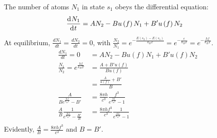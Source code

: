 \documentclass{article}
\begin{document}
\clearpage

The number of atoms $N_1$ in state $s_1$ obeys the differential equation:
\begin{equation}
    \begin{split}
        \deriv{N_1}{t} & = AN_2 - Bu\left(f\right)N_1 + B'u\left(f\right)N_2
    \end{split}
\end{equation}
At equilibrium, $\frac{dN_1}{dt} = \frac{dN_2}{dt} = 0$, with $\frac{N_2}{N_1} = e^{-\frac{E(s_2) - E(s_1)}{k_BT}} = e^{-\frac{\epsilon}{k_BT}} = e^{-\frac{hf}{k_BT}}$. 
    \begin{equation}
        \begin{split}
            \frac{dN_1}{dt} = 0 & = AN_2 - Bu\left(f\right)N_1 + B'u\left(f\right)N_2 \\
            \frac{N_1}{N_2} = e^{\frac{hf}{k_BT}} & = \frac{A + B'u\left(f\right)}{Bu\left(f\right)} \\
            & = \frac{\frac{A}{u\left(f\right)} + B'}{B} \\
            \frac{A}{Be^{\frac{hf}{k_BT}} - B'} & = \frac{8\pi h}{c^3}\frac{f^3}{e^{\frac{hf}{k_BT}} - 1} \\    
            \frac{A}{B}\frac{1}{e^{\frac{hf}{k_BT}} - \frac{B'}{B}} & = \frac{8\pi hf^3}{c^3}\frac{1}{e^{\frac{hf}{k_BT}} - 1} \\
        \end{split}
    \end{equation}
    Evidently, $\frac{A}{B} = \frac{8\pi hf^3}{c^3}$ and $B = B'$.

\clearpage
\end{document}
